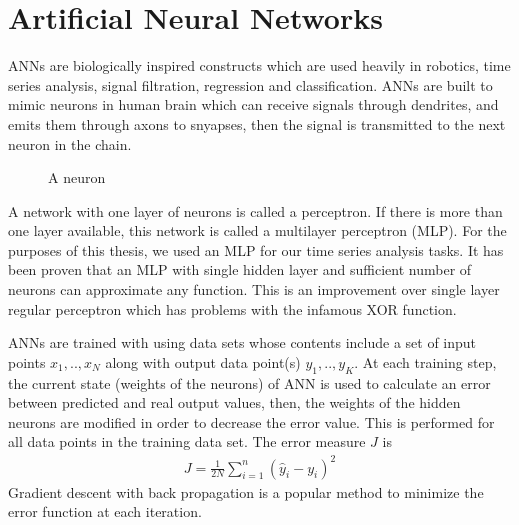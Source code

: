 \section{Artificial Neural Networks}

ANNs are biologically inspired constructs which are used heavily in robotics,
time series analysis, signal filtration, regression and classification. ANNs are
built to mimic neurons in human brain which can receive signals through
dendrites, and emits them through axons to snyapses, then the signal is
transmitted to the next neuron in the chain.

\begin{figure}[h]
\caption{A neuron}
\vspace{0.6cm}
\end{figure}

A network with one layer of neurons is called a perceptron. If there is more
than one layer available, this network is called a multilayer perceptron
(MLP). For the purposes of this thesis, we used an MLP for our time series
analysis tasks. It has been proven that an MLP with single hidden layer and
sufficient number of neurons can approximate any function. This is an
improvement over single layer regular perceptron which has problems with the
infamous XOR function.

ANNs are trained with using data sets whose contents include a set of input
points $x_1,..,x_N$ along with output data point(s) $y_1,..,y_K$. At each
training step, the current state (weights of the neurons) of ANN is used to
calculate an error between predicted and real output values, then, the weights
of the hidden neurons are modified in order to decrease the error value. This is
performed for all data points in the training data set. The error measure $J$ is
\begin{eqnarray*}
J = \frac{1}{2N}\sum_{i=1}^n (\hat{y}_i - y_i)^2
\end{eqnarray*}
Gradient descent with back propagation is a popular method to minimize the error
function at each iteration. 

